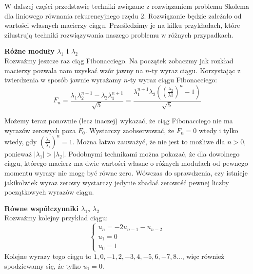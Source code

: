 \documentclass[leqno,10pt]{article}
\begin{document}





\vfill
{}

W dalszej części przedstawię techniki związane z rozwiązaniem problemu Skolema dla liniowego równania rekurencyjnego rzędu 2. Rozwiązanie będzie zależało od wartości własnych macierzy ciągu. Prześledzimy je na kilku przykładach, które zilustrują techniki rozwiązywania naszego problemu w różnych przypadkach.

\textbf{Różne moduły $\lambda_1$ i $\lambda_2$}\\
Rozważmy jeszcze raz ciąg Fibonacciego. Na początek zobaczmy jak rozkład macierzy pozwala nam uzyskać wzór jawny na $n$-ty wyraz ciągu. Korzystając z twierdzenia w sposób jawnie wyrażamy $n$-ty wyraz ciągu Fibonacciego:
\begin{equation*}
    F_{n} = \frac{\lambda_1 \lambda_2^{n+1}-\lambda_2 \lambda_1^{n+1}}{\sqrt{5}} = \frac{\lambda_1^{n+1}\lambda_2\left(\left(\frac{\lambda_2}{\lambda1}\right)^{n}-1\right)}{\sqrt{5}}
\end{equation*}

Możemy teraz ponownie (lecz inaczej) wykazać, że ciąg Fibonacciego nie ma wyrazów zerowych poza $F_0$. Wystarczy zaobserwować, że $F_n = 0$ wtedy i tylko wtedy, gdy $(\frac{\lambda_2}{\lambda_1})^{n}=1$. Można łatwo zauważyć, że nie jest to możliwe dla $n > 0$, ponieważ $|\lambda_1| > |\lambda_2|$.
Podobnymi technikami można pokazać, że dla dowolnego ciągu, którego macierz ma dwie wartości własne o różnych modułach od pewnego momentu wyrazy nie mogę być równe zero. Wówczas do sprawdzenia, czy istnieje jakikolwiek wyraz zerowy wystarczy jedynie zbadać zerowość pewnej liczby początkowych wyrazów ciągu.

\textbf{Równe współczynniki $\lambda_1$, $\lambda_2$}\\
Rozważmy kolejny przykład ciągu:
\begin{equation}\label{przyk:3}
    \begin{cases}
        u_n = -2 u_{n-1} - u_{n-2} \\
        u_1 = 0 \\
        u_0 = 1
    \end{cases}
\end{equation}
Kolejne wyrazy tego ciągu to $1, 0, -1, 2, -3, 4, -5, 6, -7, 8 \ldots$, więc również spodziewamy się, że tylko $u_1 = 0$.
\end{document}
